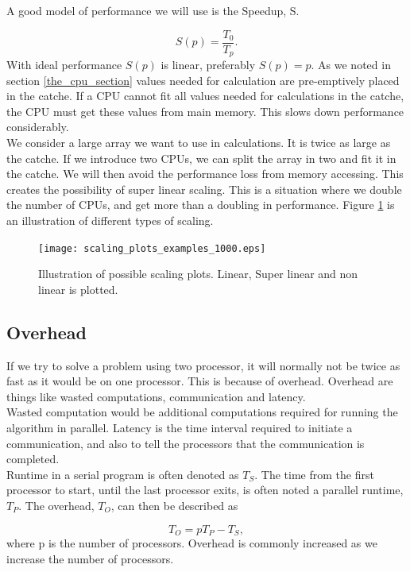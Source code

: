 \documentclass[a4paper,norsk,11pt,twoside]{report}
\begin{document}
A good model of performance we will use is the Speedup, S.

\begin{equation}
S(p) = \frac{T_0}{T_p} .
\end{equation}
With ideal performance $S(p)$ is linear, preferably $S(p) = p$. As we noted in section \ref{the_cpu_section} values needed for calculation are pre-emptively placed in the catche. If a CPU cannot fit all values needed for calculations in the catche, the CPU must get these values from main memory. This slows down performance considerably. \\

We consider a large array we want to use in calculations. It is twice as large as the catche. If we introduce two CPUs, we can split the array in two and fit it in the catche. We will then avoid the performance loss from memory accessing. This creates the possibility of super linear scaling. This is a situation where we double the number of CPUs, and get more than a doubling in performance. Figure \ref{super_linear_scaling} is an illustration of different types of scaling.

\begin{figure}[ht!]
\centering
\texttt{[image: scaling\_plots\_examples\_1000.eps]}
\caption{Illustration of possible scaling plots. Linear, Super linear and non linear is plotted.}
\label{super_linear_scaling}
\end{figure}

\subsection{Overhead}
If we try to solve a problem using two processor, it will normally not be twice as fast as it would be on one processor. This is because of overhead. Overhead are things like wasted computations, communication and latency. \\

Wasted computation would be additional computations required for running the algorithm in parallel. Latency is the time interval required to initiate a communication, and also to tell the processors that the communication is completed. \\

Runtime in a serial program is often denoted as $T_S$. The time from the first processor to start, until the last processor exits, is often noted a parallel runtime, $T_P$. The overhead, $T_O$, can then be described as

\begin{equation}
T_O = p T_P - T_S ,
\end{equation}
where p is the number of processors. Overhead is commonly increased as we increase the number of processors.
\end{document}
